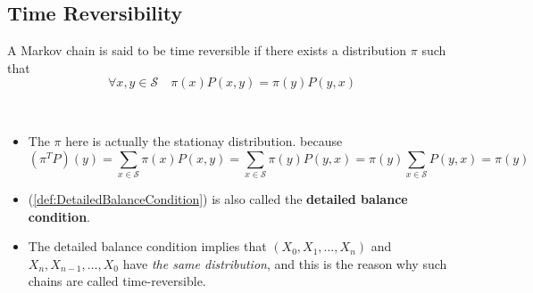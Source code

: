     \subsection{Time Reversibility}
        \begin{definition}
            A Markov chain is said to be time reversible if there exists a distribution $\pi$ such that
            \begin{equation}\label{def:DetailedBalanceCondition}
                \forall x,y \in \mathcal{S} \quad \pi(x)P(x,y) = \pi(y)P(y,x)
            \end{equation}
        \end{definition}
        \begin{remark} ~{}
            \begin{itemize}
                \item The $\pi$ here is actually the stationay distribution. because
                \[ (\pi^TP)(y) = \sum_{x\in\mathcal{S}}\pi(x)P(x,y) = \sum_{x\in\mathcal{S}}\pi(y)P(y,x) = \pi(y)\sum_{x\in\mathcal{S}}P(y,x) = \pi(y) \]
                \item (\ref{def:DetailedBalanceCondition}) is also called the \textbf{detailed balance condition}.
                \item The detailed balance condition implies that $(X_0,X_1,\dots,X_n)$ and $X_n,X_{n-1},\dots,X_0$ have \emph{the same distribution}, and this is the reason why such chains are called time-reversible.
            \end{itemize}
        \end{remark}

